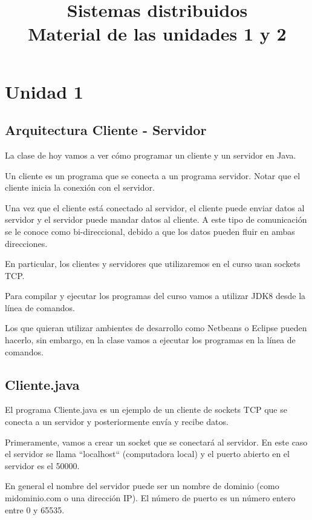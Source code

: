 \documentclass[11pt,a4paper,oneside]{book}
\begin{document}
\frontmatter
\title{\textbf{Sistemas distribuidos}\\[0.6em]\large Material de las unidades 1 y 2}
\author{}
\date{}
\maketitle
\tableofcontents
\mainmatter
\part{Unidad 1}

\chapter{Arquitectura Cliente - Servidor}

La clase de hoy vamos a ver cómo programar un cliente y un servidor en Java.

Un cliente es un programa que se conecta a un programa servidor. Notar que el cliente inicia la conexión con el servidor.

Una vez que el cliente está conectado al servidor, el cliente puede enviar datos al servidor y el servidor puede mandar datos al cliente. A este tipo de comunicación se le conoce como bi-direccional, debido a que los datos pueden fluir en ambas direcciones.

En particular, los clientes y servidores que utilizaremos en el curso usan sockets TCP.

Para compilar y ejecutar los programas del curso vamos a utilizar JDK8 desde la línea de comandos.

Los que quieran utilizar ambientes de desarrollo como Netbeans o Eclipse pueden hacerlo, sin embargo, en la clase vamos a ejecutar los programas en la línea de comandos.

\chapter{Cliente.java}

El programa Cliente.java es un ejemplo de un cliente de sockets TCP que se conecta a un servidor y posteriormente envía y recibe datos.

Primeramente, vamos a crear un socket que se conectará al servidor. En este caso el servidor se llama ``localhost`` (computadora local) y el puerto abierto en el servidor es el 50000.

En general el nombre del servidor puede ser un nombre de dominio (como midominio.com o una dirección IP). El número de puerto es un número entero entre 0 y 65535.
\end{document}
